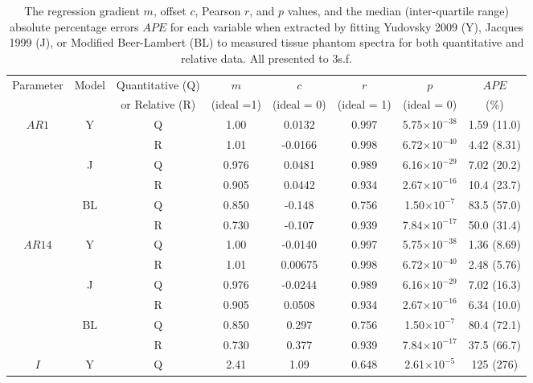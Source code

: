 \begin{table}[htb!]
    \centering
    \caption{The regression gradient $m$, offset $c$, Pearson $r$, and $p$ values, and the median (inter-quartile range) absolute percentage errors $APE$ for each variable when extracted by fitting Yudovsky 2009 (Y), Jacques 1999 (J), or Modified Beer-Lambert (BL) to measured tissue phantom spectra for both quantitative and relative data. All presented to 3s.f.}
    \begin{tabular}{|ccc|ccccc|}
        \hline
        Parameter & Model & Quantitative (Q) & $m$ & $c$ & $r$ & $p$ & $APE$ \\
        & & or Relative (R) & (ideal =1) & (ideal = 0) & (ideal = 1) & (ideal = 0) & (\%)\\
        \hline
        \multirow{6}{*}{$AR1$} & \multirow{2}{*}{Y} & Q & 1.00 & 0.0132 & 0.997 & 5.75$\times 10^{-38}$ & 1.59 (11.0) \\
        & & R & 1.01 & -0.0166 & 0.998 & 6.72$\times 10^{-40}$ & 4.42 (8.31) \\
        \cline{2-8}
        & \multirow{2}{*}{J} & Q & 0.976 & 0.0481 & 0.989 & 6.16$\times 10^{-29}$ & 7.02 (20.2) \\
        & & R & 0.905 & 0.0442 & 0.934 & 2.67$\times 10^{-16}$ & 10.4 (23.7) \\
        \cline{2-8}
        & \multirow{2}{*}{BL} & Q & 0.850 & -0.148 & 0.756 & 1.50$\times 10^{-7}$ & 83.5 (57.0) \\
        & & R & 0.730 & -0.107 & 0.939 & 7.84$\times 10^{-17}$ & 50.0 (31.4)\\
        \hline
        \multirow{6}{*}{$AR14$} & \multirow{2}{*}{Y} & Q & 1.00 & -0.0140 & 0.997 & 5.75$\times 10^{-38}$ & 1.36 (8.69) \\
        & & R & 1.01 & 0.00675 & 0.998 & 6.72$\times 10^{-40}$ & 2.48 (5.76) \\
        \cline{2-8}
        & \multirow{2}{*}{J} & Q & 0.976 & -0.0244 & 0.989 & 6.16$\times 10^{-29}$ & 7.02 (16.3) \\
        & & R & 0.905 & 0.0508 & 0.934 & 2.67$\times 10^{-16}$ & 6.34 (10.0) \\
        \cline{2-8}
        & \multirow{2}{*}{BL} & Q & 0.850 & 0.297 & 0.756 & 1.50$\times 10^{-7}$ & 80.4 (72.1) \\
        & & R & 0.730 & 0.377 & 0.939 & 7.84$\times 10^{-17}$ & 37.5 (66.7) \\
        \hline
        \multirow{6}{*}{$I$} & \multirow{2}{*}{Y} & Q & 2.41 & 1.09 & 0.648 & 2.61$\times 10^{-5}$ & 125 (276) \\

\end{tabular}
\end{table}
